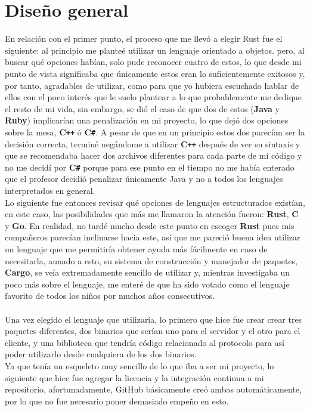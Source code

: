 \documentclass[11pt]{article}
\begin{document}
\section{Diseño general}
En relación con el primer punto, el proceso que me llevó a elegir Rust fue el siguiente: al principio me planteé utilizar un lenguaje orientado a objetos. pero, al buscar qué opciones habían, solo pude reconocer cuatro de estos, lo que desde mi punto de vista significaba que únicamente estos eran lo suficientemente exitosos y, por tanto, agradables de utilizar, como para que yo hubiera escuchado hablar de ellos con el poco interés que le suelo plantear a lo que probablemente me dedique el resto de mi vida, sin embargo, se dió el caso de que dos de estos (\textbf{Java} y \textbf{Ruby}) implicarían una penalización en mi proyecto, lo que dejó dos opciones sobre la mesa, \textbf{C\texttt{++}} ó \textbf{C\texttt{\#}}. A pesar de que en un principio estos dos parecían ser la decisión correcta, terminé negándome a utilizar \textbf{C\texttt{++}} después de ver su sintaxis y que se recomendaba hacer dos archivos diferentes para cada parte de mi código y no me decidí por \textbf{C\texttt{\#}} porque para ese punto en el tiempo no me había enterado que el profesor decidió penalizar únicamente Java y no a todos los lenguajes interpretados en general.\\
Lo siguiente fue entonces revisar qué opciones de lenguajes estructurados existían, en este caso, las posibilidades que más me llamaron la atención fueron: \textbf{Rust}, \textbf{C} y \textbf{Go}. En realidad, no tardé mucho desde este punto en escoger \textbf{Rust} pues mis compañeros parecían inclinarse hacia este, así que me pareció buena idea utilizar un lenguaje que me permitiría obtener ayuda más fácilmente en caso de necesitarla, aunado a esto, su sistema de construcción y manejador de paquetes, \textbf{Cargo}, se veía extremadamente sencillo de utilizar y, mientras investigaba un poco más sobre el lenguaje, me enteré de que ha sido votado como el lenguaje favorito de todos los niños por muchos años consecutivos.\\\\
Una vez elegido el lenguaje que utilizaría, lo primero que hice fue crear crear tres paquetes diferentes, dos binarios que serían uno para el servidor y el otro para el cliente, y una biblioteca que tendría código relacionado al protocolo para así poder utilizarlo desde cualquiera de los dos binarios.\\
Ya que tenía un esqueleto muy sencillo de lo que iba a ser mi proyecto, lo siguiente que hice fue agregar la licencia y la integración continua a mi repositorio, afortunadamente, GitHub básicamente creó ambas automáticamente, por lo que no fue necesario poner demasiado empeño en esto.\\
\end{document}

